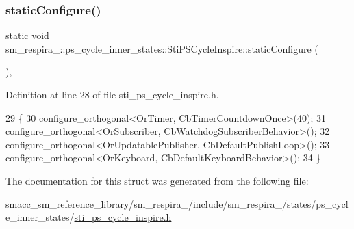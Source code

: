 \subsubsection{\texorpdfstring{static\+Configure()}{staticConfigure()}}
{\footnotesize\ttfamily static void sm\+\_\+respira\+\_\+::ps\+\_\+cycle\+\_\+inner\+\_\+states\+::\+Sti\+P\+S\+Cycle\+Inspire\+::static\+Configure (\begin{DoxyParamCaption}{ }\end{DoxyParamCaption})\hspace{0.3cm}{\ttfamily [inline]}, {\ttfamily [static]}}



Definition at line 28 of file sti\+\_\+ps\+\_\+cycle\+\_\+inspire.\+h.


\begin{DoxyCode}
29   \{
30     configure\_orthogonal<OrTimer, CbTimerCountdownOnce>(40);
31     configure\_orthogonal<OrSubscriber, CbWatchdogSubscriberBehavior>();
32     configure\_orthogonal<OrUpdatablePublisher, CbDefaultPublishLoop>();
33     configure\_orthogonal<OrKeyboard, CbDefaultKeyboardBehavior>();
34   \}
\end{DoxyCode}


The documentation for this struct was generated from the following file\+:\begin{DoxyCompactItemize}
\item 
smacc\+\_\+sm\+\_\+reference\+\_\+library/sm\+\_\+respira\+\_/include/sm\+\_\+respira\+\_/states/ps\+\_\+cycle\+\_\+inner\+\_\+states/\hyperlink{sti__ps__cycle__inspire_8h}{sti\+\_\+ps\+\_\+cycle\+\_\+inspire.\+h}\end{DoxyCompactItemize}
